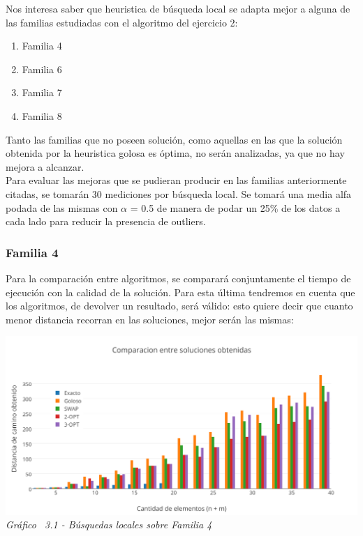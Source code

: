 Nos interesa saber que heuristica de búsqueda local se adapta mejor a alguna de las familias estudiadas con el algoritmo del ejercicio 2:

\begin{enumerate}
\item Familia 4
\item Familia 6
\item Familia 7
\item Familia 8
\end{enumerate}

Tanto las familias que no  poseen solución, como aquellas en las que la solución obtenida por la heuristica golosa es óptima, no serán analizadas, ya que no hay mejora a alcanzar.\\
 
Para evaluar las mejoras que se pudieran producir en las familias anteriormente citadas, se tomarán 30 mediciones por búsqueda local. Se tomará una media alfa podada de las mismas con $\alpha$ = 0.5 de manera de podar un 25\% de los datos a cada lado para reducir la presencia de outliers.



\subsubsection*{Familia 4}

Para la comparación entre algoritmos, se comparará conjuntamente el tiempo de ejecución con la calidad de la solución. Para esta última tendremos en cuenta que los algoritmos, de devolver un resultado, será válido: esto quiere decir que cuanto menor distancia recorran en las soluciones, mejor serán las mismas:

\vspace*{0.3cm} \vspace*{0.3cm}
  \begin{center}
 \includegraphics[scale=0.5]{./EJ3/comparacionbusquedaslocalessoluciongym0.png}
 {            \textit{Gráfico \ 3.1 - Búsquedas locales sobre Familia 4}}
  \end{center}
  \vspace*{0.3cm}
  
